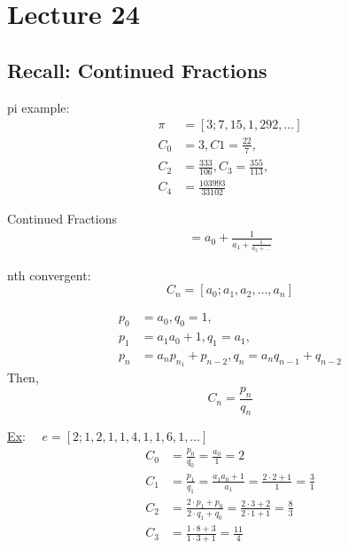 \chapter{Lecture 24}
\date{November 21, 2024}

\section{Recall: Continued Fractions}
    pi example:
    \begin{align*}
        \pi &= [3;7,15,1,292,\dots] \\
        C_0 &= 3, C1 = \frac{22}{7}, \\
        C_2 &= \frac{333}{106}, C_3 = \frac{355}{113}, \\
        C_4 &= \frac{103993}{33102}
    \end{align*}

    Continued Fractions
    \begin{align*}
        [a_0; a_1, a_2, \dots] = a_0 + \frac{1}{a_1 + \frac{1}{a_2 + \dots}}
    \end{align*}

    nth convergent:
    \[
        C_n = [a_0; a_1, a_2, \dots, a_n]
    \]

    \begin{theorem}
        \begin{align*}
            p_0 &= a_0, q_0 = 1, \\
            p_1 &= a_1a_0+1, q_1 = a_1, \\
            p_n &= a_np_{n_1}+p_{n-2}, q_n=a_nq_{n-1}+q_{n-2}
        \end{align*}
        Then,
        \[
            C_n = \frac{p_n}{q_n}
        \]
    \end{theorem}

    \underline{Ex}: $\quad e = [2;1,2,1,1,4,1,1,6,1,\dots]$
    \begin{align*}
        C_0 &= \frac{p_0}{q_0} = \frac{a_0}{1} = 2 \\
        C_1 &= \frac{p_1}{q_1} = \frac{a_1a_0+1}{a_1} = \frac{2\cdot 2 + 1}{1} = \frac{3}{1} \\
        C_2 &= \frac{2\cdot p_1 + p_0}{2\cdot q_1 + q_0} = \frac{2\cdot 3 + 2}{2\cdot 1 + 1} = \frac{8}{3} \\
        C_3 &= \frac{1\cdot 8 + 3}{1\cdot 3 + 1} = \frac{11}{4}
    \end{align*}
        
